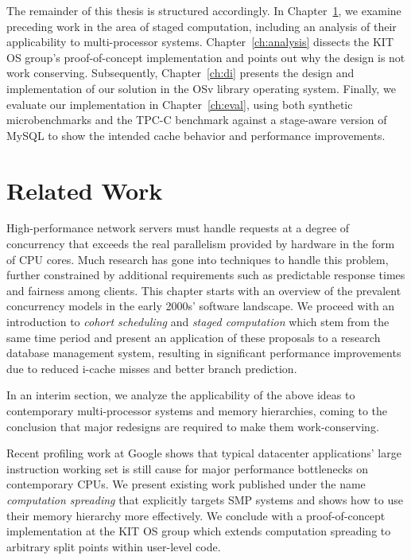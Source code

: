 \documentclass[12pt,a4paper]{book}
\begin{document}
The remainder of this thesis is structured accordingly.
In Chapter~\ref{ch:relwork}, we examine preceding work in the area of staged computation, including an analysis of their applicability to multi-processor systems.
Chapter~\ref{ch:analysis} dissects the KIT OS group's proof-of-concept implementation and points out why the design is not work conserving.
Subsequently, Chapter~\ref{ch:di} presents the design and implementation of our solution in the OSv library operating system.
Finally, we evaluate our implementation in Chapter~\ref{ch:eval}, using both synthetic microbenchmarks and the TPC-C benchmark against a stage-aware version of MySQL to show the intended cache behavior and performance improvements.


\chapter{Related Work}\label{ch:relwork}
High-performance network servers must handle requests at a degree of concurrency that exceeds the real parallelism provided by hardware in the form of CPU cores.
Much research has gone into techniques to handle this problem, further constrained by additional requirements such as predictable response times and fairness among clients.
This chapter starts with an overview of the prevalent concurrency models in the early 2000s' software landscape.
We proceed with an introduction to \emph{cohort scheduling} and \emph{staged computation} which stem from the same time period
and present an application of these proposals to a research database management system, resulting in significant performance improvements due to reduced i-cache misses and better branch prediction.

In an interim section, we analyze the applicability of the above ideas to contemporary multi-processor systems and memory hierarchies, coming to the conclusion that major redesigns are required to make them work-conserving.

Recent profiling work at Google shows that typical datacenter applications' large instruction working set is still cause for major performance bottlenecks on contemporary CPUs.
We present existing work published under the name \emph{computation spreading} that explicitly targets SMP systems and shows how to use their memory hierarchy more effectively.
We conclude with a proof-of-concept implementation at the KIT OS group which extends computation spreading to arbitrary split points within user-level code.
\end{document}
